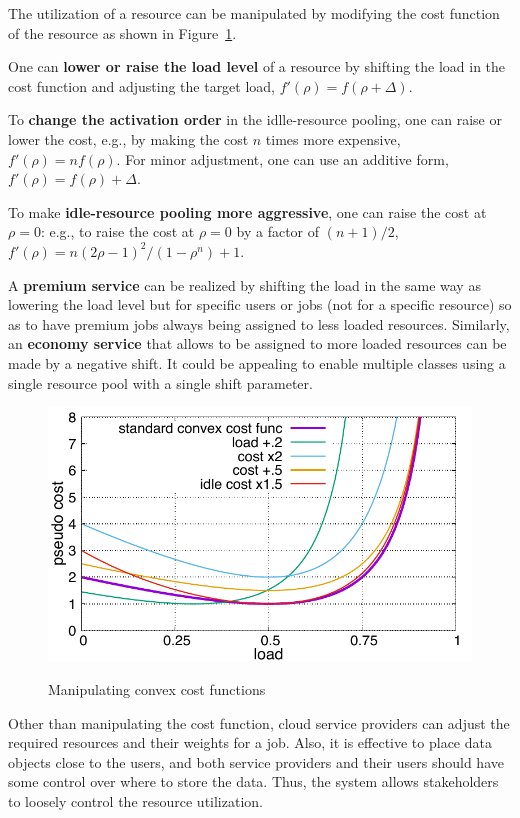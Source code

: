 The utilization of a resource can be manipulated by modifying the cost
function of the resource as shown in Figure~\ref{fig:costfunc3}.

One can {\bf lower or raise the load level} of a resource by shifting
the load in the cost function and adjusting the target load,
$f'(\rho) = f(\rho + \Delta)$.

To {\bf change the activation order} in the idlle-resource pooling,
one can raise or lower the cost,
e.g., by making the cost  $n$ times more expensive, $f'(\rho) = n f(\rho)$.
For minor adjustment, one can use an additive form,
$f'(\rho) = f(\rho) + \Delta$.

To make {\bf idle-resource pooling more aggressive},
one can raise the cost at $\rho = 0$:
e.g., to raise the cost at $\rho = 0$ by a factor of $(n+1)/2$,
$f'(\rho) = n (2\rho - 1)^{2}/(1 - \rho^{n}) + 1$.

A {\bf premium service} can be realized by shifting the load
in the same way as lowering the load level
but for specific users or jobs (not for a specific resource) so as to
have premium jobs always being assigned to less loaded resources.
Similarly, an {\bf economy service} that allows to be assigned to more
loaded resources can be made by a negative shift.
It could be appealing to enable multiple classes using a single
resource pool with a single shift parameter.

\begin{figure}[tb]
  \begin{center}
    \includegraphics[width=1.0\columnwidth]{costfunc3.pdf}
    \vspace{-2.0ex}
    \caption{Manipulating convex cost functions}
    \label{fig:costfunc3}
  \end{center}
\end{figure}

Other than manipulating the cost function,
cloud service providers can adjust the required resources and their
weights for a job.  Also, it is effective to place data objects close to the
users, and both service providers and their users should have some
control over where to store the data.
Thus, the system allows stakeholders to loosely control the
resource utilization.
